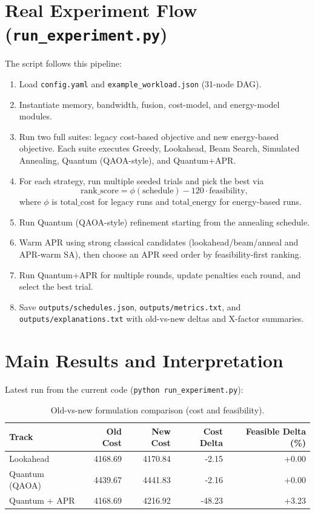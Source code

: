 \documentclass[11pt]{article}
\begin{document}
\section{Real Experiment Flow (\texttt{run\_experiment.py})}
The script follows this pipeline:
\begin{enumerate}
    \item Load \texttt{config.yaml} and \texttt{example\_workload.json} (31-node DAG).
    \item Instantiate memory, bandwidth, fusion, cost-model, and energy-model modules.
    \item Run two full suites: legacy cost-based objective and new energy-based objective. Each suite executes Greedy, Lookahead, Beam Search, Simulated Annealing, Quantum (QAOA-style), and Quantum+APR.
    \item For each strategy, run multiple seeded trials and pick the best via
    \[
    \text{rank\_score} = \phi(\text{schedule}) - 120 \cdot \text{feasibility},
    \]
    where \(\phi\) is \(\text{total\_cost}\) for legacy runs and \(\text{total\_energy}\) for energy-based runs.
    \item Run Quantum (QAOA-style) refinement starting from the annealing schedule.
    \item Warm APR using strong classical candidates (lookahead/beam/anneal and APR-warm SA), then choose an APR seed order by feasibility-first ranking.
    \item Run Quantum+APR for multiple rounds, update penalties each round, and select the best trial.
    \item Save \texttt{outputs/schedules.json}, \texttt{outputs/metrics.txt}, and \texttt{outputs/explanations.txt} with old-vs-new deltas and X-factor summaries.
\end{enumerate}

\section{Main Results and Interpretation}
Latest run from the current code (\texttt{python run\_experiment.py}):

\begin{table}[h]
\centering
\begin{tabular}{lrrrr}
\toprule
Track & Old Cost & New Cost & Cost Delta & Feasible Delta (\%) \\
\midrule
Lookahead & 4168.69 & 4170.84 & -2.15 & +0.00 \\
Quantum (QAOA) & 4439.67 & 4441.83 & -2.16 & +0.00 \\
Quantum + APR & 4168.69 & 4216.92 & -48.23 & +3.23 \\
\bottomrule
\end{tabular}
\caption{Old-vs-new formulation comparison (cost and feasibility).}
\end{table}
\end{document}
